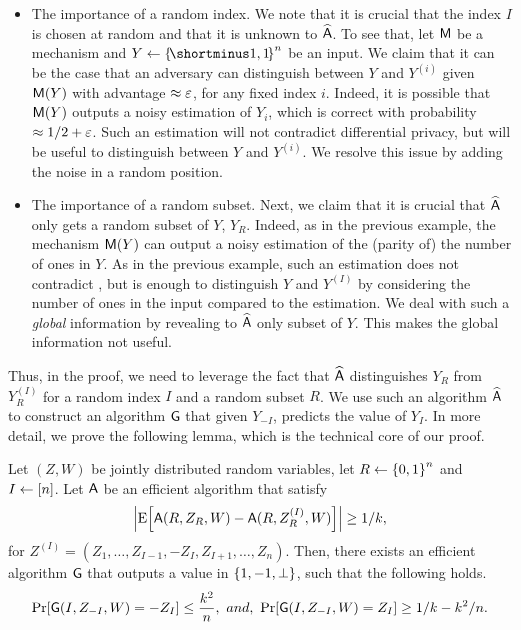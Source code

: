 \begin{itemize}
    \item {\sf The importance of a random index.}  We note that it is crucial that the index $I$ is chosen at random and that it is unknown to $\widehat{\mathsf{A}}$. To see that, let $\mathsf{M}$ be a \DP mechanism and $Y\gets \oo^n$ be an input. We claim that it can be the case that an adversary can distinguish between $Y$ and $Y^{(i)}$ given $\mathsf{M}(Y)$ with advantage $\approx \varepsilon$, for any fixed index $i$. Indeed, it is possible that $\mathsf{M}(Y)$ outputs a noisy estimation of $Y_i$, which is correct with probability $\approx 1/2 + \varepsilon$. Such an estimation will not contradict differential privacy, but will be useful to distinguish between $Y$ and $Y^{(i)}$. We resolve this issue by adding the noise in a random position.
    \item {\sf The importance of a random subset.} Next, we claim that it is crucial that $\widehat{\mathsf{A}}$ only gets a random subset of $Y$, $Y_R$. Indeed, as in the previous example, the mechanism $\mathsf{M}(Y)$ can output a noisy estimation of the (parity of) the number of ones in $Y$. As in the previous example, such an estimation does not contradict \DP, but is enough to distinguish $Y$ and $Y^{(I)}$ by considering the number of ones in the input compared to the estimation. We deal with such a \emph{global} information by revealing to $\widehat{\mathsf{A}}$ only subset of $Y$. This makes the global information not useful.
\end{itemize}

Thus, in the proof, we need to leverage the fact that $\widehat{\mathsf{A}}$ distinguishes $Y_R$ from $Y^{(I)}_R$ for a random index $I$ and a random subset $R$. We use such an algorithm $\widehat{\mathsf{A}}$ to construct an algorithm $\mathsf{G}$ that given $Y_{-I}$, predicts the value of $Y_I$. In more detail, we prove the following lemma, which is the technical core of our proof.

\begin{lemma}\label{lemma:property1:prediction:overview}
	Let $(Z,W)$ be jointly distributed random variables, let $R \la \zo^n$ and $I \gets [n]$. 
	Let  $\mathsf{A}$ be an efficient algorithm that satisfy
	\begin{align*}
		\size{\ex{\Ac(R,Z_{R},W) - \Ac(R,Z^{(I)}_{R},W)}} \geq 1/k,
	\end{align*}
	for $Z^{(I)} = (Z_1,\ldots, Z_{I-1}, -Z_I, Z_{I+1},\ldots, Z_n)$. Then, there exists an efficient algorithm $\mathsf{G}$ that outputs a value in $\set{1,-1,\bot}$, such that the following holds.
		$$\pr{\Gc(I,Z_{-I}, W) = -Z_I} \leq \frac{k^2}{n},\ and,\ \pr{\Gc(I,Z_{-I}, W) = Z_I} \geq 1/k - k^2/n.$$
\end{lemma}

